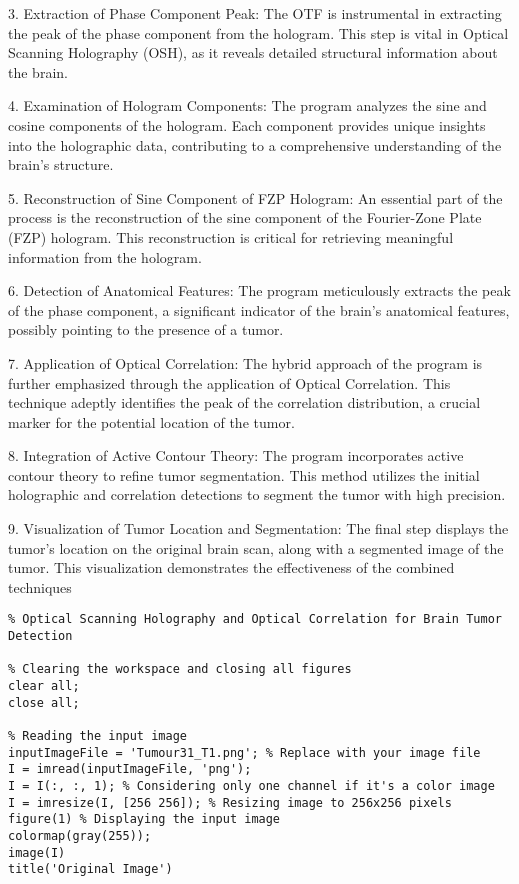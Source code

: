 \begin{appendices}
3. Extraction of Phase Component Peak: The OTF is instrumental in extracting the peak of the phase component from the hologram. This step is vital in Optical Scanning Holography (OSH), as it reveals detailed structural information about the brain.

4. Examination of Hologram Components: The program analyzes the sine and cosine components of the hologram. Each component provides unique insights into the holographic data, contributing to a comprehensive understanding of the brain’s structure.

5. Reconstruction of Sine Component of FZP Hologram: An essential part of the process is the reconstruction of the sine component of the Fourier-Zone Plate (FZP) hologram. This reconstruction is critical for retrieving meaningful information from the hologram.

6. Detection of Anatomical Features: The program meticulously extracts the peak of the phase component, a significant indicator of the brain's anatomical features, possibly pointing to the presence of a tumor.

7. Application of Optical Correlation: The hybrid approach of the program is further emphasized through the application of Optical Correlation. This technique adeptly identifies the peak of the correlation distribution, a crucial marker for the potential location of the tumor.

8. Integration of Active Contour Theory: The program incorporates active contour theory to refine tumor segmentation. This method utilizes the initial holographic and correlation detections to segment the tumor with high precision.

9. Visualization of Tumor Location and Segmentation: The final step displays the tumor's location on the original brain scan, along with a segmented image of the tumor. This visualization demonstrates the effectiveness of the combined techniques
\begin{lstlisting}
% Optical Scanning Holography and Optical Correlation for Brain Tumor Detection

% Clearing the workspace and closing all figures
clear all;
close all;

% Reading the input image
inputImageFile = 'Tumour31_T1.png'; % Replace with your image file
I = imread(inputImageFile, 'png');
I = I(:, :, 1); % Considering only one channel if it's a color image
I = imresize(I, [256 256]); % Resizing image to 256x256 pixels
figure(1) % Displaying the input image
colormap(gray(255));
image(I)
title('Original Image')


\end{lstlisting}
\end{appendices}
